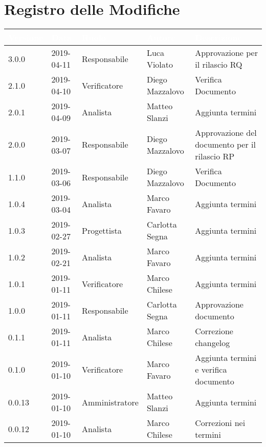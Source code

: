 \section*{Registro delle Modifiche}

\begin{center}
\begin{longtable}[c]{|m{}|m{}|m{}|m{}|p{}|}
\hline
\rowcolor{bluelogo}\textbf{\textcolor{white}{Versione}} & \textbf{\textcolor{white}{Data}} & \textbf{\textcolor{white}{Ruolo}} & \textbf{\textcolor{white}{Autore}} & \textbf{\textcolor{white}{Descrizione}} \\
\hline \hline
\endhead
3.0.0 & 2019-04-11 & Responsabile & Luca Violato & Approvazione per il rilascio RQ \\
\hline
\rowcolor{grigio}2.1.0 & 2019-04-10 & Verificatore & Diego Mazzalovo & Verifica Documento \\
\hline
2.0.1 & 2019-04-09 & Analista & Matteo Slanzi & Aggiunta termini \\
\hline
\rowcolor{grigio}2.0.0 & 2019-03-07 & Responsabile & Diego Mazzalovo & Approvazione del documento per il rilascio RP \\
\hline 
1.1.0 & 2019-03-06 & Responsabile & Diego Mazzalovo & Verifica Documento \\
\hline
\rowcolor{grigio}1.0.4 & 2019-03-04 & Analista & Marco Favaro & Aggiunta termini \\
\hline
1.0.3 & 2019-02-27 & Progettista & Carlotta Segna & Aggiunta termini \\
\hline
\rowcolor{grigio}1.0.2 & 2019-02-21 & Analista & Marco Favaro & Aggiunta termini\\
\hline
1.0.1 & 2019-01-11 & Verificatore & Marco Chilese & Aggiunta termini\\
\hline
\rowcolor{grigio}1.0.0 & 2019-01-11 & Responsabile & Carlotta Segna & Approvazione documento \\
\hline
0.1.1 & 2019-01-11 & Analista & Marco Chilese & Correzione changelog\\
\hline
\rowcolor{grigio}0.1.0 & 2019-01-10 & Verificatore & Marco Favaro & Aggiunta termini e verifica documento\\
\hline
0.0.13 & 2019-01-10 & Amministratore & Matteo Slanzi & Aggiunta termini\\
\hline
\rowcolor{grigio}0.0.12 & 2019-01-10 & Analista & Marco Chilese & Correzioni nei termini\\

\end{longtable}
\end{center}
